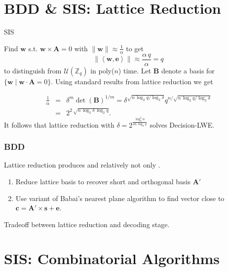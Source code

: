 \documentclass[10pt]{beamer}
\newcommand{\U}[1]{\ensuremath{\mathcal{U}(#1)\xspace}}
\newcommand{\abs}[1]{\ensuremath{\|#1\|}\xspace}
\newcommand{\dotp}[2]{\ensuremath{\left\langle {#1},{#2}\right\rangle}\xspace}
\renewcommand{\vec}[1]{\mathbf{#1}\xspace}
\newcommand{\cemph}[1]{{\color{yellow9}{\bf #1}}\xspace}
\newcommand{\Z}{\ensuremath{\mathbb{Z}}\xspace}
\newcommand{\Zq}{\ensuremath{\Z_q}\xspace}
\begin{document}
\section{BDD \& SIS: Lattice Reduction}

\begin{frame}{SIS}

Find $\vec{w}$ s.t. $\vec{w} \times \vec{A} = 0$ with $\abs{\vec{w}} \approx \frac{1}{\alpha}$ to get $$\abs{\dotp{\vec{w}}{\vec{e}}} \approx \frac{\alpha\, q}{\alpha} = q$$
to distinguish from $\U{\Zq}$ in poly($n$) time. Let $\vec{B}$ denote a basis for $\{\vec{w} \mid \vec{w}\cdot \vec{A} = 0\}$.
Using standard results from lattice reduction we get

\begin{eqnarray*}
\frac{1}{\alpha} &=& \delta^m \det(\vec{B})^{1/m} = \delta^{\sqrt{n\,\log_2 q/\log_2\delta}} q^{n/\sqrt{n\,\log_2 q /\log_2\delta}}\\
&=& 2^{2 \, \sqrt{n\, \log_2 \delta \, \log_2 q }}.
\end{eqnarray*}
It follows that lattice reduction with $\delta = 2^{\frac{\log_2^2 \alpha }{4n\,\log_2 q }}$ solves Decision-LWE.

\end{frame}


\begin{frame}
\frametitle{BDD}

Lattice reduction produces \cemph{short} and relatively \cemph{orthogonal bases} not only  \cemph{short vectors}.

\begin{enumerate}
  \item Reduce lattice basis to recover short and orthogonal basis $\vec{A'}$
  \item Use variant of Babai's nearest plane algorithm to find vector close to $\vec{c} = \vec{A'} \times \vec{s} + \vec{e}$.
\end{enumerate}

\begin{block}{}
Tradeoff between lattice reduction and decoding stage.
\end{block}


\end{frame}


\section{SIS: Combinatorial Algorithms}
\end{document}

